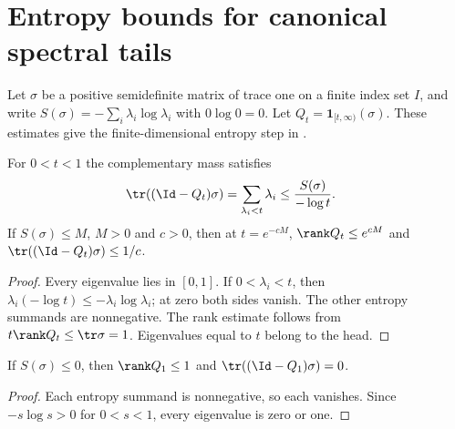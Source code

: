 \section{Entropy bounds for canonical spectral tails}
\label{sec:entropy_spectral_tail}

Let $\sigma$ be a positive semidefinite matrix of trace one on a finite
index set $I$, and write $S(\sigma)=-\sum_i\lambda_i\log\lambda_i$ with
$0\log0=0$. Let $Q_t=\mathbf 1_{[t,\infty)}(\sigma)$.
These estimates give the finite-dimensional entropy step in
\cite[Section~4, constant-tail ranks]{OpenAI2026PolynomialPEPS}.

\begin{theorem}
\label{thm:entropy_spectral_tail}
\leanok
For $0<t<1$ the complementary mass satisfies
\begin{align}
 \tr((\Id-Q_t)\sigma)
 &=\sum_{\lambda_i<t}\lambda_i
 \le\frac{S(\sigma)}{-\log t}.
\end{align}
If $S(\sigma)\le M$, $M>0$ and $c>0$, then at $t=e^{-cM}$,
$\rank Q_t\le e^{cM}$ and $\tr((\Id-Q_t)\sigma)\le1/c$.
\end{theorem}
\begin{proof}
\leanok
{}
Every eigenvalue lies in $[0,1]$. If $0<\lambda_i<t$, then
$\lambda_i(-\log t)\le-\lambda_i\log\lambda_i$; at zero both sides vanish.
The other entropy summands are nonnegative. The rank estimate follows from
$t\rank Q_t\le\tr\sigma=1$. Eigenvalues equal to $t$ belong to the head.
\end{proof}

\begin{theorem}
\label{thm:entropy_spectral_tail_zero}
\leanok
If $S(\sigma)\le0$, then $\rank Q_1\le1$ and
$\tr((\Id-Q_1)\sigma)=0$.
\end{theorem}
\begin{proof}
\leanok
Each entropy summand is nonnegative, so each vanishes. Since
$-s\log s>0$ for $0<s<1$, every eigenvalue is zero or one.
\end{proof}

